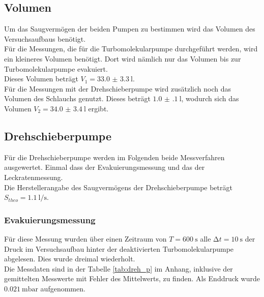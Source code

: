       \subsection{Volumen}
        Um das Saugvermögen der beiden Pumpen zu bestimmen wird das Volumen des Versuchsaufbaus benötigt.\\
        Für die Messungen, die für die Turbomolekularpumpe durchgeführt werden, wird ein kleineres Volumen benötigt.
        Dort wird nämlich nur das Volumen bis zur Turbomolekularpumpe evakuiert.\\
        Dieses Volumen beträgt $V_1 = \SI{33.0(33)}{\litre}$.\\
        Für die Messungen mit der Drehschieberpumpe wird zusätzlich noch das Volumen des Schlauchs genutzt. 
        Dieses beträgt $\SI{1.0(1)}{\litre}$, wodurch sich das Volumen $V_2 = \SI{34.0(34)}{\litre}$ ergibt.\\



      \subsection{Drehschieberpumpe}

        \noindent Für die Drehschieberpumpe werden im Folgenden beide Messverfahren ausgewertet. Einmal dass der Evakuierungsmessung und das der Leckratenmessung.\\
        Die Herstellerangabe des Saugvermögens der Drehschieberpumpe beträgt $ S_{theo} = \SI{1.1}{\litre\per\second}$\cite{V70}.

        \subsubsection{Evakuierungsmessung}

        \noindent Für diese Messung wurden über einen Zeitraum von $ T = \SI{600}{\second}$ alle $ \increment t = \SI{10}{\second}$
        der Druck im Versuchsaufbau hinter der deaktivierten Turbomolekularpumpe abgelesen. Dies wurde dreimal wiederholt.\\
        Die Messdaten sind in der Tabelle \ref{tab:dreh_p} im Anhang, inklusive der gemittelten Messwerte mit Fehler des Mittelwerts, zu finden.
        Als Enddruck wurde $\SI{0.021}{\milli\bar}$ aufgenommen. 
        \\\\
        
